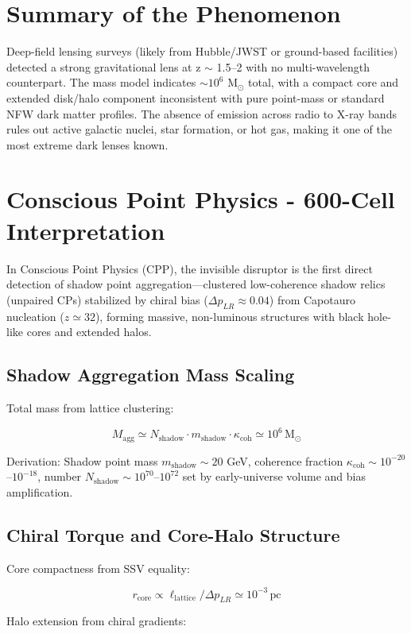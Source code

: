 \documentclass[11pt]{article}
\begin{document}
\section{Summary of the Phenomenon}
Deep-field lensing surveys (likely from Hubble/JWST or ground-based facilities) detected a strong gravitational lens at z $\sim$ 1.5--2 with no multi-wavelength counterpart. The mass model indicates $\sim 10^6$ M$_\odot$ total, with a compact core and extended disk/halo component inconsistent with pure point-mass or standard NFW dark matter profiles. The absence of emission across radio to X-ray bands rules out active galactic nuclei, star formation, or hot gas, making it one of the most extreme dark lenses known.

\section{Conscious Point Physics - 600-Cell Interpretation}
In Conscious Point Physics (CPP), the invisible disruptor is the first direct detection of shadow point aggregation—clustered low-coherence shadow relics (unpaired CPs) stabilized by chiral bias ($\Delta p_{LR} \approx 0.04$) from Capotauro nucleation ($z \simeq 32$), forming massive, non-luminous structures with black hole-like cores and extended halos.

\subsection{Shadow Aggregation Mass Scaling}
Total mass from lattice clustering:

\[
M_{\text{agg}} \simeq N_{\text{shadow}} \cdot m_{\text{shadow}} \cdot \kappa_{\text{coh}} \simeq 10^6 \, \text{M}_\odot
\]

Derivation: Shadow point mass $m_{\text{shadow}} \sim 20$ GeV, coherence fraction $\kappa_{\text{coh}} \sim 10^{-20}$--$10^{-18}$, number $N_{\text{shadow}} \sim 10^{70}$--$10^{72}$ set by early-universe volume and bias amplification.

\subsection{Chiral Torque and Core-Halo Structure}
Core compactness from SSV equality:

\[
r_{\text{core}} \propto \ell_{\text{lattice}} / \Delta p_{LR} \simeq 10^{-3} \, \text{pc}
\]

Halo extension from chiral gradients:
\end{document}
